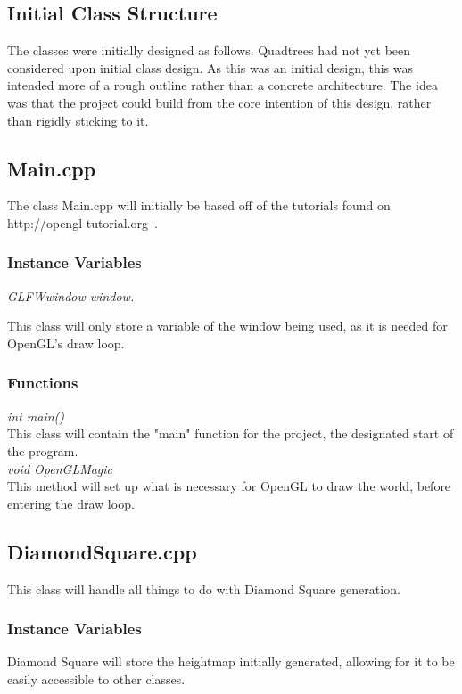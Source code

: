 \documentclass[a4paper,10pt]{report}
\begin{document}
\subsection{Initial Class Structure}
The classes were initially designed as follows. Quadtrees had not yet been considered upon initial class design. As this was an initial design, this was intended more of a rough outline rather than a concrete architecture. The idea was that the project could build from the core intention of this design, rather than rigidly sticking to it. 

\subsection{Main.cpp}

The class Main.cpp will initially be based off of the tutorials found on http://opengl-tutorial.org~\cite{opengl_tutorial}.

\subsubsection{Instance Variables}
\textit{GLFWwindow window.} 

This class will only store a variable of the window being used, as it is needed for OpenGL's draw loop.
\subsubsection{Functions}
\textit{int main()}\\
This class will contain the "main" function for the project, the designated start of the program. \\

\textit{void OpenGLMagic}\\
This method will set up what is necessary for OpenGL to draw the world, before entering the draw loop.


\subsection{DiamondSquare.cpp}

This class will handle all things to do with Diamond Square generation. 

\subsubsection{Instance Variables}

Diamond Square will store the heightmap initially generated, allowing for it to be easily accessible to other classes.
\end{document}

